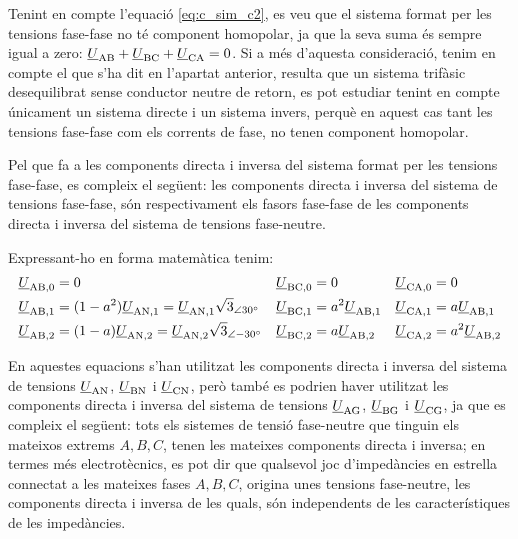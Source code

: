 \begin{center}
    
    \label{pic:Comp_sim_tens}
\end{center}

Tenint en compte l'equació \eqref{eq:c_sim_c2}, es veu que el sistema
format per les tensions fase-fase no té component homopolar, ja que
la seva suma  és sempre igual a zero: $\underline{U}_\mathrm{AB} +
\underline{U}_\mathrm{BC} + \underline{U}_\mathrm{CA} = 0$. Si a més
d'aquesta consideració, tenim en compte el que s'ha dit en l'apartat
anterior, resulta que un sistema trifàsic desequilibrat sense conductor
neutre de retorn, es pot estudiar tenint en compte únicament un sistema directe
i un sistema invers, perquè en aquest cas tant les tensions fase-fase com els
corrents de fase, no tenen component homopolar.

Pel que fa a les components directa i inversa del sistema format per
les tensions fase-fase, es compleix el següent: les components
directa i inversa del sistema de tensions fase-fase, són
respectivament els fasors fase-fase de les components directa i
inversa del sistema de tensions fase-neutre.

Expressant-ho en forma matemàtica tenim:
\begin{subequations}
\begin{align}
   \underline{U}_\mathrm{AB,0} &= 0 &
   \underline{U}_\mathrm{BC,0} &= 0 &
   \underline{U}_\mathrm{CA,0} &= 0 \\
   \underline{U}_\mathrm{AB,1} &= (1-a^2) \underline{U}_\mathrm{AN,1} =
   \underline{U}_\mathrm{AN,1} \sqrt{3}_{\angle\ang{30}} &
   \underline{U}_\mathrm{BC,1} &= a^2 \underline{U}_\mathrm{AB,1} &
   \underline{U}_\mathrm{CA,1} &= a \underline{U}_\mathrm{AB,1} \label{eq:c_sim_a3} \\
   \underline{U}_\mathrm{AB,2} &= (1-a) \underline{U}_\mathrm{AN,2}  =
   \underline{U}_\mathrm{AN,2} \sqrt{3}_{\angle\ang{-30}}&
   \underline{U}_\mathrm{BC,2} &= a \underline{U}_\mathrm{AB,2} &
   \underline{U}_\mathrm{CA,2} &= a^2 \underline{U}_\mathrm{AB,2} \label{eq:c_sim_b3}
\end{align}
\end{subequations}

En aquestes equacions s'han utilitzat les components directa i
inversa del sistema de tensions
$\underline{U}_\mathrm{AN}$, $\underline{U}_\mathrm{BN}$ i $\underline{U}_\mathrm{CN}$,
però també es podrien haver utilitzat les components directa i
inversa del sistema de tensions
$\underline{U}_\mathrm{AG}$, $\underline{U}_\mathrm{BG}$ i $\underline{U}_\mathrm{CG}$,
ja que es compleix el següent: tots els sistemes de tensió
fase-neutre que tinguin els mateixos extrems $A, B,
C$, tenen les mateixes components directa i inversa; en termes
més electrotècnics, es pot dir que qualsevol joc d'impedàncies en
estrella connectat a les mateixes fases $A, B, C$,
origina unes tensions fase-neutre, les components directa i inversa
de les quals, són independents de les característiques de les
impedàncies.

